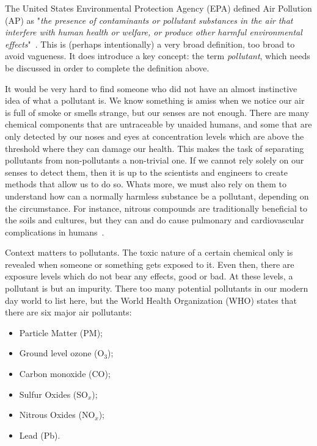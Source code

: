 The United States Environmental Protection Agency (\Gls{EPA}) defined
Air Pollution (\Gls{AP}) as "\textit{the presence of contaminants or
    pollutant substances in the air that interfere with human health or
    welfare, or produce other harmful environmental
effects}"~\cite{Vallero2014}. This is (perhaps intentionally) a very
broad definition, too broad to avoid vagueness. It does introduce a key
concept: the term \emph{pollutant}, which needs be discussed in order
to complete the definition above.

It would be very hard to find someone who did not have an almost
instinctive idea of what a pollutant is. We know something is amiss when
we notice our air is full of smoke or smells strange, but our senses are
not enough. There are many chemical components that are untraceable by
unaided humans, and some that are only detected by our noses and eyes at
concentration levels which are above the threshold where they can damage
our health. This makes the task of separating pollutants from
non-pollutants a non-trivial one. If we cannot rely solely on our senses
to detect them, then it is up to the scientists and engineers to create
methods that allow us to do so. Whats more, we must also rely on them to
understand how can a normally harmless substance be a pollutant,
depending on the circumstance. For instance, nitrous compounds are
traditionally beneficial to the soils and cultures, but they can and do
cause pulmonary and  cardiovascular complications in
humans~\cite{Kampa2008, Ghorani-Azam2016, Carugno2016}.

Context matters to pollutants. The toxic nature of a certain chemical
only is revealed when someone or something gets exposed to it. Even
then, there are exposure levels which do not bear any effects, good or
bad. At these levels, a pollutant is but an impurity. There too many
potential pollutants in our modern day world to list here, but the World
Health Organization (\gls{WHO}) states that there are six major air
pollutants:
\begin{itemize}
    \item Particle Matter (\gls{PM});
    \item Ground level ozone (O$_3$);
    \item Carbon monoxide (CO);
    \item Sulfur Oxides (SO$_x$);
    \item Nitrous Oxides (NO$_x$);
    \item Lead (Pb).
\end{itemize}

